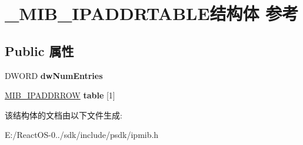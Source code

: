 \hypertarget{struct___m_i_b___i_p_a_d_d_r_t_a_b_l_e}{}\section{\+\_\+\+M\+I\+B\+\_\+\+I\+P\+A\+D\+D\+R\+T\+A\+B\+L\+E结构体 参考}
\label{struct___m_i_b___i_p_a_d_d_r_t_a_b_l_e}
\subsection*{Public 属性}
\begin{DoxyCompactItemize}
\item 
\mbox{\label{struct___m_i_b___i_p_a_d_d_r_t_a_b_l_e_ae184fce16cc532cecac2fa8ebc135be4}} 
D\+W\+O\+RD {\bfseries dw\+Num\+Entries}
\item 
\mbox{\label{struct___m_i_b___i_p_a_d_d_r_t_a_b_l_e_ab6016c147c0eb4ab07a224ed00c32e3a}} 
\hyperlink{struct___m_i_b___i_p_a_d_d_r_r_o_w}{M\+I\+B\+\_\+\+I\+P\+A\+D\+D\+R\+R\+OW} {\bfseries table} \mbox{[}1\mbox{]}
\end{DoxyCompactItemize}


该结构体的文档由以下文件生成\+:\begin{DoxyCompactItemize}
\item 
E\+:/\+React\+O\+S-\/0../sdk/include/psdk/ipmib.\+h\end{DoxyCompactItemize}
